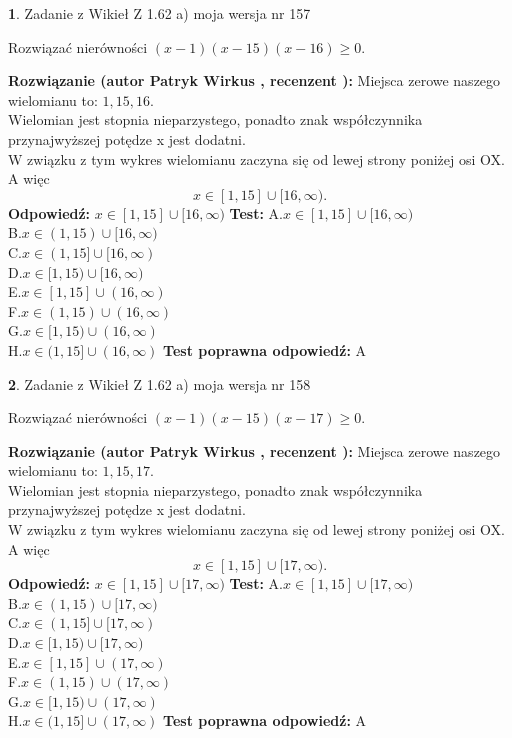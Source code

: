 \documentclass[12pt, a4paper]{article}
\theoremstyle{definition} %
\newtheorem{zad}{}
\newcommand{\zadStart}[1]{\begin{zad}#1\newline}
\newcommand{\zadStop}{\end{zad}}
\newcommand{\rozwStart}[2]{\noindent \textbf{Rozwiązanie (autor #1 , recenzent #2): }\newline}
\newcommand{\rozwStop}{\newline}
\newcommand{\odpStart}{\noindent \textbf{Odpowiedź:}\newline}
\newcommand{\odpStop}{\newline}
\newcommand{\testStart}{\noindent \textbf{Test:}\newline}
\newcommand{\testStop}{\newline}
\newcommand{\kluczStart}{\noindent \textbf{Test poprawna odpowiedź:}\newline}
\newcommand{\kluczStop}{\newline}
\begin{document}
\zadStart{Zadanie z Wikieł Z 1.62 a) moja wersja nr 157}

Rozwiązać nierówności $(x-1)(x-15)(x-16)\ge0$.
\zadStop
\rozwStart{Patryk Wirkus}{}
Miejsca zerowe naszego wielomianu to: $1, 15, 16$.\\
Wielomian jest stopnia nieparzystego, ponadto znak współczynnika przy\linebreak najwyższej potędze x jest dodatni.\\ W związku z tym wykres wielomianu zaczyna się od lewej strony poniżej osi OX. A więc $$x \in [1,15] \cup [16,\infty).$$
\rozwStop
\odpStart
$x \in [1,15] \cup [16,\infty)$
\odpStop
\testStart
A.$x \in [1,15] \cup [16,\infty)$\\
B.$x \in (1,15) \cup [16,\infty)$\\
C.$x \in (1,15] \cup [16,\infty)$\\
D.$x \in [1,15) \cup [16,\infty)$\\
E.$x \in [1,15] \cup (16,\infty)$\\
F.$x \in (1,15) \cup (16,\infty)$\\
G.$x \in [1,15) \cup (16,\infty)$\\
H.$x \in (1,15] \cup (16,\infty)$
\testStop
\kluczStart
A
\kluczStop



\zadStart{Zadanie z Wikieł Z 1.62 a) moja wersja nr 158}

Rozwiązać nierówności $(x-1)(x-15)(x-17)\ge0$.
\zadStop
\rozwStart{Patryk Wirkus}{}
Miejsca zerowe naszego wielomianu to: $1, 15, 17$.\\
Wielomian jest stopnia nieparzystego, ponadto znak współczynnika przy\linebreak najwyższej potędze x jest dodatni.\\ W związku z tym wykres wielomianu zaczyna się od lewej strony poniżej osi OX. A więc $$x \in [1,15] \cup [17,\infty).$$
\rozwStop
\odpStart
$x \in [1,15] \cup [17,\infty)$
\odpStop
\testStart
A.$x \in [1,15] \cup [17,\infty)$\\
B.$x \in (1,15) \cup [17,\infty)$\\
C.$x \in (1,15] \cup [17,\infty)$\\
D.$x \in [1,15) \cup [17,\infty)$\\
E.$x \in [1,15] \cup (17,\infty)$\\
F.$x \in (1,15) \cup (17,\infty)$\\
G.$x \in [1,15) \cup (17,\infty)$\\
H.$x \in (1,15] \cup (17,\infty)$
\testStop
\kluczStart
A
\kluczStop
\end{document}
